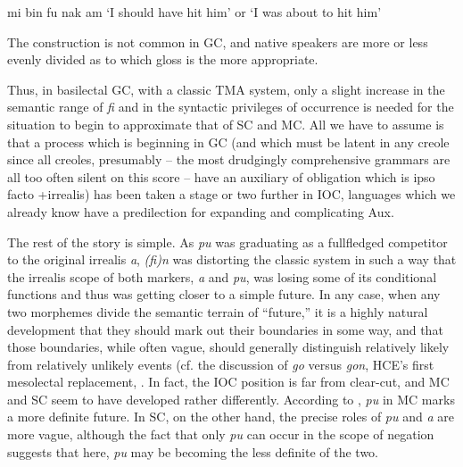 \ea\label{ex:2:121}
mi bin fu nak am
\glt `I should have hit him' or `I was about to hit him'
\z

The construction is not common in GC, and native speakers are more or less evenly divided as to which gloss is the more appropriate.

Thus, in basilectal GC, with a classic TMA system, only a slight increase in the semantic range of \textit{fi} and in the syntactic privileges of occurrence is needed for the situation to begin to approximate that of SC and MC. All we have to assume is that a process which is beginning in GC (and which must be latent in any creole since all creoles, presumably -- the most drudgingly comprehensive grammars are all too often silent on this score -- have an auxiliary of obligation which is ipso facto +irrealis) has been taken a stage or two further in IOC, languages which we already know have a predilection for expanding and complicating Aux.

The rest of the story is simple. As \textit{pu} was graduating as a full\-fledged competitor to the original irrealis \textit{a}, \textit{(fi)n} was distorting the classic system in such a way that the irrealis scope of both markers, \textit{a} and \textit{pu}, was losing some of its conditional functions and thus was getting closer to a simple future. In any case, when any two mor\-phemes divide the semantic terrain of ``future,'' it is a highly natural development that they should mark out their boundaries in some way, and that those boundaries, while often vague, should generally dis\-tinguish relatively likely from relatively unlikely events (cf. the discus\-sion of \textit{go} versus \textit{gon}, HCE's first mesolectal replacement, \citet[23ff., 181ff.]{Bickerton1977}.
In fact, the IOC position is far from clear-cut, and MC and SC seem to have developed rather differently. According to \citet{Corne1977}, \textit{pu} in MC marks a more definite future. In SC, on the other hand, the precise roles of \textit{pu} and \textit{a} are more vague, although the fact that only \textit{pu} can occur in the scope of negation suggests that here, \textit{pu} may be becoming the less definite of the two.\\\\

